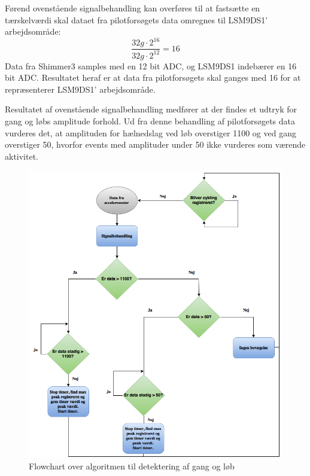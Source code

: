 Førend ovenstående signalbehandling kan overføres til at fastsætte en tærskelværdi skal dataet fra pilotforsøgets data omregnes til LSM9DS1' arbejdsområde: 
\begin{equation}
\frac{32 g \cdot 2^{16}}{32 g \cdot 2^{12}} = 16
\end{equation}
Data fra Shimmer3 samples med en 12 bit ADC, og LSM9DS1 indebærer en 16 bit ADC. Resultatet heraf er at data fra pilotforsøgets skal ganges med 16 for at repræsenterer LSM9DS1' arbejdsområde.

Resultatet af ovenstående signalbehandling medfører at der findes et udtryk for gang og løbs amplitude forhold. Ud fra denne behandling af pilotforsøgets data vurderes det, at amplituden for hælnedslag ved løb overstiger 1100 og ved gang overstiger 50, hvorfor events med amplituder under 50 ikke vurderes som værende aktivitet.

\begin{figure}[H]
	\centering
	\includegraphics[scale=0.5]{figures/cDesign/algoritme_gl.png}
	\caption{Flowchart over algoritmen til detektering af gang og løb}
	\label{fig:algoritme}
\end{figure}

